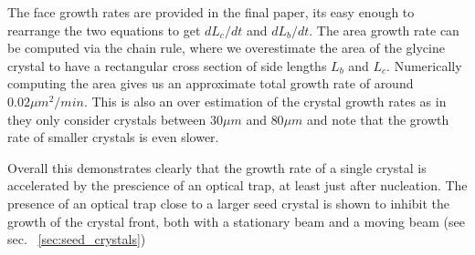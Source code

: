 \documentclass[a4paper,oneside,11pt]{book}
\begin{document}
The face growth rates are provided in the final paper, its
easy enough to rearrange the two equations to get $dL_c/dt$
and $dL_b/dt$. The area growth rate can be computed via the
chain rule, where we overestimate the area of the glycine 
crystal to have a rectangular cross section of side lengths
$L_b$ and $L_c$. Numerically computing the area gives us an
approximate total growth rate of around $0.02 \mu m^2/min$.
This is also an over estimation of the crystal growth rates 
as in \cite{Li1992} they only consider crystals between 
$30\mu m$ and $80\mu m$ and note that the growth rate of 
smaller crystals is even slower. 

Overall this demonstrates clearly that the growth rate of a
single crystal is accelerated by the prescience of an optical
trap, at least just after nucleation. The presence of an 
optical trap close to a larger seed crystal is shown to 
inhibit the growth of the crystal front, both with a stationary
beam \cite{Flannigan2023} and a moving beam (see sec.~
\ref{sec:seed_crystals})
\printbibliography
\end{document}
